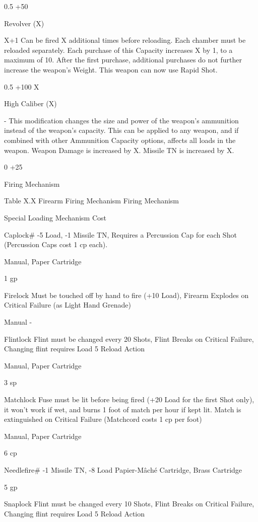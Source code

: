 \documentclass[oneside,11pt,english]{book}
\begin{document}
0.5 +50%

Revolver 
(X) 

X+1 Can be fired X additional times before reloading. Each chamber must be reloaded 
separately. Each purchase of this Capacity increases X by 1, to a maximum of 10. 
After the first purchase, additional purchases do not further increase the weapon’s 
Weight. 
This weapon can now use Rapid Shot. 

0.5 +100%
X 

High 
Caliber 
(X) 

- This modification changes the size and power of the weapon’s ammunition instead of 
the weapon’s capacity. This can be applied to any weapon, and if combined with 
other Ammunition Capacity options, affects all loads in the weapon. 
Weapon Damage is increased by X. Missile TN is increased by X. 

0 +25%


 
Firing Mechanism 

 
Table X.X Firearm Firing Mechanism 
Firing 
Mechanism 

Special Loading Mechanism Cost 

Caplock\# -5 Load, -1 Missile TN, Requires a Percussion Cap for each Shot (Percussion 
Caps cost 1 cp each). 

Manual, Paper 
Cartridge 

1 gp 

Firelock Must be touched off by hand to fire (+10 Load), Firearm Explodes on Critical 
Failure (as Light Hand Grenade) 

Manual - 

Flintlock Flint must be changed every 20 Shots, Flint Breaks on Critical Failure, 
Changing flint requires Load 5 Reload Action 

Manual, Paper 
Cartridge 

3 sp 

Matchlock Fuse must be lit before being fired (+20 Load for the first Shot only), it won’t 
work if wet, and burns 1 foot of match per hour if kept lit. Match is 
extinguished on Critical Failure (Matchcord costs 1 cp per foot) 

Manual, Paper 
Cartridge 

6 cp 

Needlefire\# -1 Missile TN, -8 Load Papier-Mâché 
Cartridge, Brass 
Cartridge 

5 gp 

Snaplock Flint must be changed every 10 Shots, Flint Breaks on Critical Failure, 
Changing flint requires Load 5 Reload Action 
\end{document}
